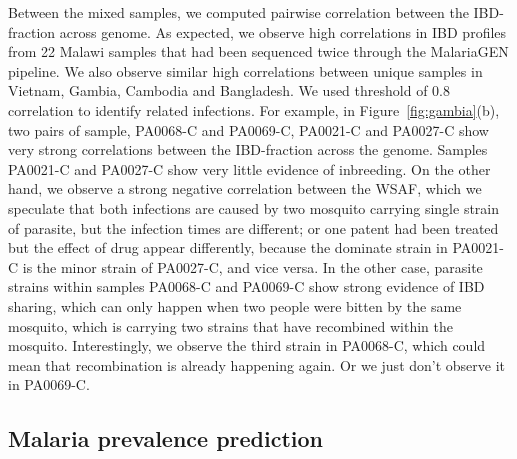 \documentclass[9pt,lineno]{elife}
\begin{document}
Between the mixed samples, we computed pairwise correlation between the IBD-fraction across genome. As expected, we observe high correlations in IBD profiles from 22 Malawi samples that had been sequenced twice through the MalariaGEN pipeline. We also observe similar high correlations between unique samples in Vietnam, Gambia, Cambodia and Bangladesh. We used threshold of 0.8 correlation to identify related infections. For example, in Figure~\ref{fig:gambia}(b), two pairs of sample, PA0068-C and PA0069-C, PA0021-C and PA0027-C show very strong correlations between the IBD-fraction across the genome. Samples PA0021-C and PA0027-C show very little evidence of inbreeding. On the other hand, we observe a strong negative correlation between the WSAF, which we speculate that both infections are caused by two mosquito carrying single strain of parasite, but the infection times are different; or one patent had been treated but the effect of drug appear differently, because the dominate strain in PA0021-C is the minor strain of PA0027-C, and vice versa. In the other case, parasite strains within samples PA0068-C and PA0069-C show strong evidence of IBD sharing, which can only happen when two people were bitten by the same mosquito, which is carrying two strains that have recombined within the mosquito. Interestingly, we observe the third strain in PA0068-C, which could mean that recombination is already happening again. Or we just don't observe it in PA0069-C.










\subsection{Malaria prevalence prediction}
\end{document}
